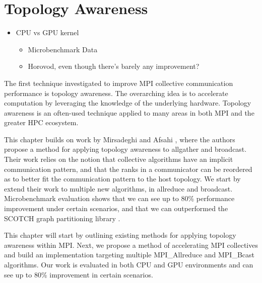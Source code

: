 
\glsresetall %
\chapter[Topology]{Topology Awareness}\label{ch:TopologyAwareness}


\begin{itemize}
    \item CPU vs GPU kernel
    \begin{itemize}
        \item Microbenchmark Data
        \item Horovod, even though there's barely any improvement?
    \end{itemize}
\end{itemize}

The first technique investigated to improve MPI collective communication performance is topology awareness.
The overarching idea is to accelerate computation by leveraging the knowledge of the underlying hardware.
Topology awareness is an often-used technique applied to many areas in both MPI and the greater HPC ecosystem.

This chapter builds on work by Mirsadeghi and Afsahi \cite{Mirsadeghi2016TopoAwareCollRR}, where the authors propose a method for applying topology awareness to allgather and broadcast.
Their work relies on the notion that collective algorithms have an implicit communication pattern, and that the ranks in a communicator can be reordered as to better fit the communication pattern to the host topology.
We start by extend their work to multiple new algorithms, in allreduce and broadcast.
Microbenchmark evaluation shows that we can see up to 80\% performance improvement under certain scenarios, and that we can outperformed the SCOTCH graph partitioning library \cite{Pellegrini2012SCOTCH}.

This chapter will start by outlining existing methods for applying topology awareness within MPI.
Next, we propose a method of accelerating MPI collectives and build an implementation targeting multiple MPI\_Allreduce and MPI\_Bcast algorithms.
Our work is evaluated in both CPU and GPU environments and can see up to 80\% improvement in certain scenarios.

